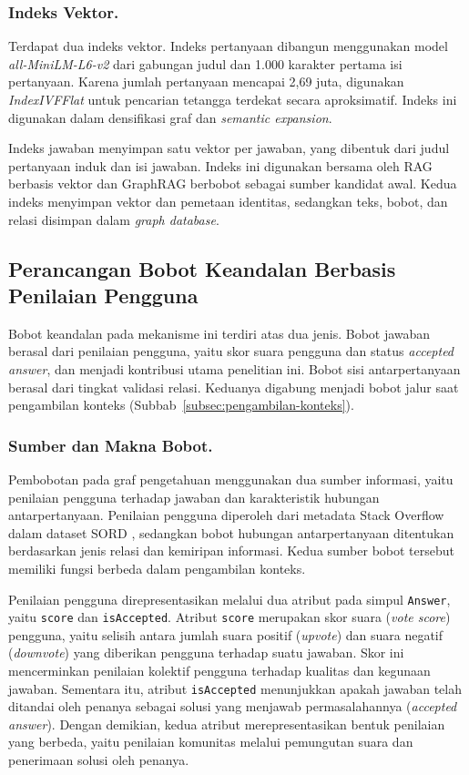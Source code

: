 \subsubsection{Indeks Vektor.}
Terdapat dua indeks vektor. Indeks pertanyaan dibangun menggunakan model \emph{all-MiniLM-L6-v2} dari gabungan judul dan 1.000 karakter pertama isi pertanyaan. Karena jumlah pertanyaan mencapai 2,69 juta, digunakan \emph{IndexIVFFlat} untuk pencarian tetangga terdekat secara aproksimatif. Indeks ini digunakan dalam densifikasi graf dan \emph{semantic expansion}.

Indeks jawaban menyimpan satu vektor per jawaban, yang dibentuk dari judul pertanyaan induk dan isi jawaban. Indeks ini digunakan bersama oleh RAG berbasis vektor dan GraphRAG berbobot sebagai sumber kandidat awal. Kedua indeks menyimpan vektor dan pemetaan identitas, sedangkan teks, bobot, dan relasi disimpan dalam \emph{graph database}.

\subsection{Perancangan Bobot Keandalan Berbasis Penilaian Pengguna}
\label{subsec:bobot-keandalan}

Bobot keandalan pada mekanisme ini terdiri atas dua jenis. Bobot jawaban berasal dari penilaian pengguna, yaitu skor suara pengguna dan status \emph{accepted answer}, dan menjadi kontribusi utama penelitian ini. Bobot sisi antarpertanyaan berasal dari tingkat validasi relasi. Keduanya digabung menjadi bobot jalur saat pengambilan konteks (Subbab~\ref{subsec:pengambilan-konteks}).

\subsubsection{Sumber dan Makna Bobot.}
Pembobotan pada graf pengetahuan menggunakan dua sumber informasi, yaitu penilaian pengguna terhadap jawaban dan karakteristik hubungan antarpertanyaan. Penilaian pengguna diperoleh dari metadata Stack Overflow dalam dataset SORD \autocite{Fatima2026}, sedangkan bobot hubungan antarpertanyaan ditentukan berdasarkan jenis relasi dan kemiripan informasi. Kedua sumber bobot tersebut memiliki fungsi berbeda dalam pengambilan konteks.

Penilaian pengguna direpresentasikan melalui dua atribut pada simpul \texttt{Answer}, yaitu \texttt{score} dan \texttt{isAccepted}. Atribut \texttt{score} merupakan skor suara (\emph{vote score}) pengguna, yaitu selisih antara jumlah suara positif (\emph{upvote}) dan suara negatif (\emph{downvote}) yang diberikan pengguna terhadap suatu jawaban. Skor ini mencerminkan penilaian kolektif pengguna terhadap kualitas dan kegunaan jawaban. Sementara itu, atribut \texttt{isAccepted} menunjukkan apakah jawaban telah ditandai oleh penanya sebagai solusi yang menjawab permasalahannya (\emph{accepted answer}). Dengan demikian, kedua atribut merepresentasikan bentuk penilaian yang berbeda, yaitu penilaian komunitas melalui pemungutan suara dan penerimaan solusi oleh penanya.

